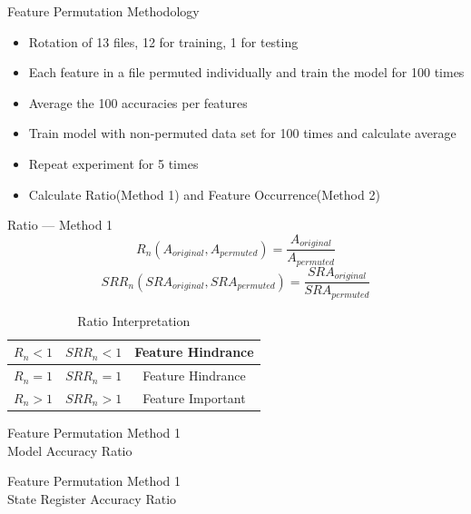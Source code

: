 \documentclass[aspectratio=169]{beamer}
\begin{document}
\begin{frame}{Feature Permutation Methodology}
\begin{itemize}
	\item Rotation of 13 files, 12 for training, 1 for testing
	\item Each feature in a file permuted individually and train the model for 100 times
	\item Average the 100 accuracies per features
	\item Train model with non-permuted data set for 100 times and calculate average
	\item Repeat experiment for 5 times
	\item Calculate Ratio(Method 1) and Feature Occurrence(Method 2)
\end{itemize}
\end{frame}

\begin{frame}{Ratio --- Method 1}
\begin{equation*}
	\label{eqn:ratio model accuracy}
   R_n(A_{original}, A_{permuted})= \frac{A_{original}}{A_{permuted}}
\end{equation*}
\begin{equation*}
   \label{ration state register accuracy}
   SRR_n(SRA_{original}, SRA_{permuted})= \frac{SRA_{original}}{SRA_{permuted}}
\end{equation*}
\begin{table}[ht]
	\centering
   \begin{tabular}{|c|c|c|}
   	\hline
   	$R_n<1$ & $SRR_n<1$ & Feature Hindrance\\
   	\hline
  		$R_n=1$ & $SRR_n=1$ & Feature Hindrance\\
   	\hline
   	$R_n>1$ & $SRR_n>1$ & Feature Important\\
   	\hline
   \end{tabular}
   \caption{Ratio Interpretation}
   \label{tab: Ratio Interpretation}
\end{table}
\end{frame}

\begin{frame}{Feature Permutation Method 1 \\Model Accuracy Ratio}
\centering
\resizebox{!}{0.7\paperheight}{
	
	\label{fig:Model Accuracy Ratio ($R_n$) Per Feature}
}
\end{frame}

\begin{frame}{Feature Permutation Method 1 \\State Register Accuracy Ratio}
\centering
\resizebox{!}{0.7\paperheight}{
	
	\label{fig:State Register Ratio ($SRR_n$) Per Feature}
}
\end{frame}
\end{document}
